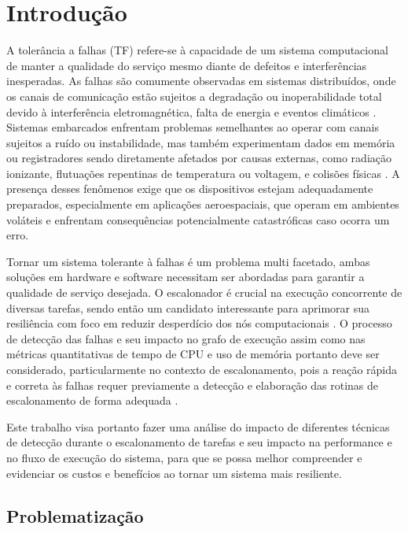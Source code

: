 \chapter{Introdução}
\label{cap:intro}

A tolerância a falhas (TF) refere-se à capacidade de um sistema computacional de manter a qualidade do serviço mesmo diante de defeitos e interferências inesperadas. As falhas são comumente observadas em sistemas distribuídos, onde os canais de comunicação estão sujeitos a degradação ou inoperabilidade total devido à interferência eletromagnética, falta de energia e eventos climáticos \cite{FaultTolerantSystems}. Sistemas embarcados enfrentam problemas semelhantes ao operar com canais sujeitos a ruído ou instabilidade, mas também experimentam dados em memória ou registradores sendo diretamente afetados por causas externas, como radiação ionizante, flutuações repentinas de temperatura ou voltagem, e colisões físicas \cite{DependabilityInEmbeddedSystems}. A presença desses fenômenos exige que os dispositivos estejam adequadamente preparados, especialmente em aplicações aeroespaciais, que operam em ambientes voláteis e enfrentam consequências potencialmente catastróficas caso ocorra um erro.

Tornar um sistema tolerante à falhas é um problema multi facetado, ambas soluções em hardware e software necessitam ser abordadas para garantir a qualidade de serviço desejada. O escalonador é crucial na execução concorrente de diversas tarefas, sendo então um candidato interessante para aprimorar sua resiliência com foco em reduzir desperdício dos nós computacionais \cite{OperatingSystemConcepts}. O processo de detecção das falhas e seu impacto no grafo de execução assim como nas métricas quantitativas de tempo de CPU e uso de memória portanto deve ser considerado, particularmente no contexto de escalonamento, pois a reação rápida e correta às falhas requer previamente a detecção e elaboração das rotinas de escalonamento de forma adequada \cite{DependabilityInEmbeddedSystems}.

Este trabalho visa portanto fazer uma análise do impacto de diferentes técnicas de detecção durante o escalonamento de tarefas e seu impacto na performance e no fluxo de execução do sistema, para que se possa melhor compreender e evidenciar os custos e benefícios ao tornar um sistema mais resiliente. 

\section{Problematização}

